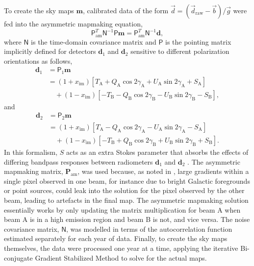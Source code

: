 \documentclass[twocolumn]{../../common/aa}
\newcommand{\dv}[0]{\vec{d}}
\newcommand{\A}[0]{\mathrm{A}}
\newcommand{\B}[0]{\mathrm{B}}
\newcommand{\bv}[0]{\vec{b}}
\newcommand{\g}[0]{\vec{g}}
\begin{document}
To create the sky maps $\boldsymbol m$, calibrated data of the form $\dv = (\dv_{\mathrm{raw}}-\bv)/\g$ were fed into the asymmetric mapmaking equation,
\begin{equation}
	\mathsf P_\mathrm{am}^T\mathsf N^{-1}\mathsf P\boldsymbol m=\mathsf P^T_\mathrm{am}\mathsf N^{-1}\boldsymbol d,
\end{equation}
where $\mathsf N$ is the time-domain covariance matrix and $\mathsf P$ is the pointing matrix implicitly defined for detectors $\boldsymbol d_1$ and $\boldsymbol d_2$ sensitive to different polarization orientations as follows,
\begin{align}
	\boldsymbol d_1&=\mathsf P_1\boldsymbol m
	\nonumber
	\\
	&=(1+x_\mathrm{im})[T_\A+Q_\A\cos2\gamma_\A+U_\A\sin2\gamma_\A+S_\A]
	\nonumber
	\\
	&\quad+(1-x_\mathrm{im})[-T_\B-Q_\B\cos2\gamma_\B-U_\B\sin2\gamma_\B-S_\B],
\end{align}
and
\begin{align}
	\boldsymbol d_2&=\mathsf P_2\boldsymbol m
	\nonumber
	\\
	&=(1+x_\mathrm{im})[T_\A-Q_\A\cos2\gamma_\A-U_\A\sin2\gamma_\A-S_\A]
	\nonumber
	\\
	&\quad+(1-x_\mathrm{im})[-T_\B+Q_\B\cos2\gamma_\B+U_\B\sin2\gamma_\B+S_\B].
\end{align}
In this formalism, $S$ acts as an extra Stokes parameter that absorbs the effects of differing bandpass responses between radiometers $\boldsymbol d_1$ and $\boldsymbol d_2$ \citep{jarosik2007}.
The asymmetric mapmaking matrix, $\boldsymbol P_\mathrm{am}$, was used because, as noted in \citet{jarosik2010}, large gradients within a single pixel observed in one beam, for instance due to bright Galactic foregrounds or point sources, could leak into the solution for the pixel observed by the other beam, leading to artefacts in the final map. The asymmetric mapmaking solution essentially works by only updating the matrix multiplication for beam A when beam A is in a high emission region and beam B is not, and vice versa. %
The noise covariance matrix, $\mathsf N$, was modelled in terms of the autocorrelation function estimated separately for each year of data.
Finally, to create the sky maps themselves, the data were processed one year at a time, applying the iterative Bi-conjugate Gradient Stabilized Method \citep[BiCG-STAB][]{bicgstab,bicgstab_template} to solve for the actual maps.
\end{document}
